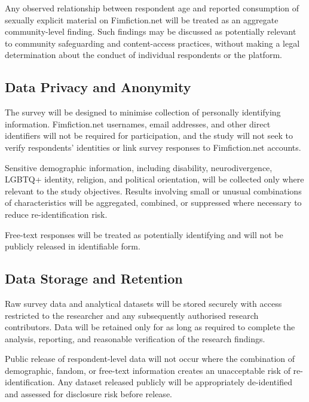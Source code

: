 Any observed relationship between respondent age and reported consumption of sexually explicit material on Fimfiction.net will be treated as an aggregate community-level finding. Such findings may be discussed as potentially relevant to community safeguarding and content-access practices, without making a legal determination about the conduct of individual respondents or the platform.

\subsection{Data Privacy and Anonymity}

The survey will be designed to minimise collection of personally identifying information. Fimfiction.net usernames, email addresses, and other direct identifiers will not be required for participation, and the study will not seek to verify respondents' identities or link survey responses to Fimfiction.net accounts.

Sensitive demographic information, including disability, neurodivergence, LGBTQ+ identity, religion, and political orientation, will be collected only where relevant to the study objectives. Results involving small or unusual combinations of characteristics will be aggregated, combined, or suppressed where necessary to reduce re-identification risk.

Free-text responses will be treated as potentially identifying and will not be publicly released in identifiable form.


\subsection{Data Storage and Retention}


Raw survey data and analytical datasets will be stored securely with access restricted to the researcher and any subsequently authorised research contributors. Data will be retained only for as long as required to complete the analysis, reporting, and reasonable verification of the research findings.

Public release of respondent-level data will not occur where the combination of demographic, fandom, or free-text information creates an unacceptable risk of re-identification. Any dataset released publicly will be appropriately de-identified and assessed for disclosure risk before release.

